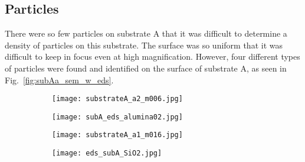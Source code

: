 \subsection{Particles}
There were so few particles on substrate A that it was difficult to determine a density of particles on this substrate. The surface was so uniform that it was difficult to keep in focus even at high magnification. However, four different types of particles were found and identified on the surface of substrate A, as seen in Fig.~\ref{fig:subAa_sem_w_eds}.

\begin{figure}
    \centering
    \begin{subfigure}[t]{\textwidth}
        \caption{}\label{fig:subAa_polishing-grit}
          \begin{minipage}[t]{0.43\linewidth}
            \centering
            \texttt{[image: substrateA\_a2\_m006.jpg]}
          \end{minipage}
          \hfill
          \begin{minipage}[t]{0.43\linewidth}
            \centering
            \texttt{[image: subA\_eds\_alumina02.jpg]}
          \end{minipage}
          \begin{minipage}[t]{0.11\linewidth}
            \centering
            \atomicTable[\ce{O} &][\ce{Al} &][&]
          \end{minipage}
    \end{subfigure}
    \par\bigskip
    \begin{subfigure}[t]{\textwidth}
        \caption{}\label{fig:subAa_large-grit}
          \begin{minipage}[t]{0.43\linewidth}
            \centering
            \texttt{[image: substrateA\_a1\_m016.jpg]}
          \end{minipage}
          \hfill
          \begin{minipage}[t]{0.43\linewidth}
            \centering
            \texttt{[image: eds\_subA\_SiO2.jpg]}
          \end{minipage}
          \begin{minipage}[t]{0.11\linewidth}
            \centering
            \atomicTable[&][&][&]
          \end{minipage}
    \end{subfigure}
    \par\bigskip

\end{figure}
